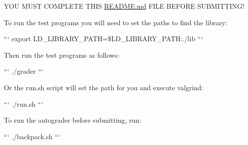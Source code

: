 Y\-O\-U M\-U\-S\-T C\-O\-M\-P\-L\-E\-T\-E T\-H\-I\-S \hyperlink{README_8md}{R\-E\-A\-D\-M\-E.\-md} F\-I\-L\-E B\-E\-F\-O\-R\-E S\-U\-B\-M\-I\-T\-T\-I\-N\-G!

To run the test programs you will need to set the paths to find the library\-:

``` export L\-D\-\_\-\-L\-I\-B\-R\-A\-R\-Y\-\_\-\-P\-A\-T\-H=\$\-L\-D\-\_\-\-L\-I\-B\-R\-A\-R\-Y\-\_\-\-P\-A\-T\-H\-:./lib ```

Then run the test programs as follows\-:

``` ./grader ```

Or the run.\-sh script will set the path for you and execute valgrind\-:

``` ./run.sh ```

To run the autograder before submitting, run\-:

``` ./backpack.sh ``` 